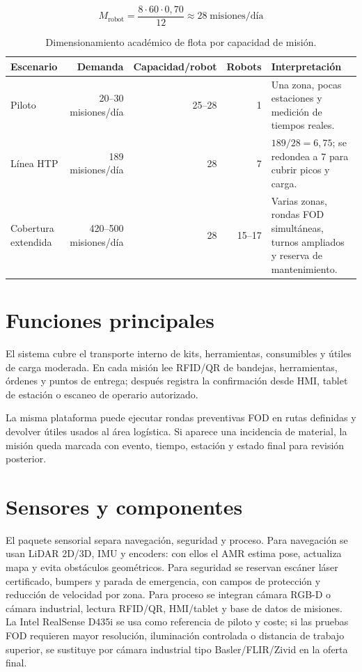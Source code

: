 \[
M_{\mathrm{robot}}=\frac{8 \cdot 60 \cdot 0{,}70}{12}\approx 28 \;\text{misiones/día}
\]

\begin{table}[H]
\centering
\begin{tabularx}{\textwidth}{P{0.20\textwidth}r r r X}
\toprule
Escenario & Demanda & Capacidad/robot & Robots & Interpretación\\
\midrule
Piloto & 20--30 misiones/día & 25--28 & 1 & Una zona, pocas estaciones y medición de tiempos reales.\\
Línea HTP & 189 misiones/día & 28 & 7 & \(189/28=6{,}75\); se redondea a 7 para cubrir picos y carga.\\
Cobertura extendida & 420--500 misiones/día & 28 & 15--17 & Varias zonas, rondas FOD simultáneas, turnos ampliados y reserva de mantenimiento.\\
\bottomrule
\end{tabularx}
\caption{Dimensionamiento académico de flota por capacidad de misión.}
\label{tab:dimensionamiento-flota}
\end{table}

\section{Funciones principales}

El sistema cubre el transporte interno de kits, herramientas, consumibles y útiles de carga moderada. En cada misión lee RFID/QR de bandejas, herramientas, órdenes y puntos de entrega; después registra la confirmación desde HMI, tablet de estación o escaneo de operario autorizado.

La misma plataforma puede ejecutar rondas preventivas FOD en rutas definidas y devolver útiles usados al área logística. Si aparece una incidencia de material, la misión queda marcada con evento, tiempo, estación y estado final para revisión posterior.

\section{Sensores y componentes}

El paquete sensorial separa navegación, seguridad y proceso. Para navegación se usan LiDAR 2D/3D, IMU y encoders: con ellos el AMR estima pose, actualiza mapa y evita obstáculos geométricos. Para seguridad se reservan escáner láser certificado, bumpers y parada de emergencia, con campos de protección y reducción de velocidad por zona. Para proceso se integran cámara RGB-D o cámara industrial, lectura RFID/QR, HMI/tablet y base de datos de misiones. La Intel RealSense D435i se usa como referencia de piloto y coste; si las pruebas FOD requieren mayor resolución, iluminación controlada o distancia de trabajo superior, se sustituye por cámara industrial tipo Basler/FLIR/Zivid en la oferta final.

